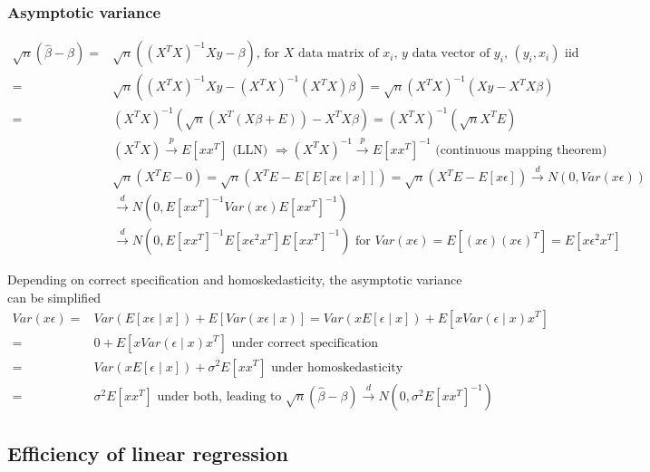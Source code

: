 \documentclass{article}
\begin{document}
\subsubsection{Asymptotic variance}
\begin{align*}
  \sqrt{n}(\hat{\beta} - \beta) =& \sqrt{n}((X^TX)^{-1}Xy - \beta) \textrm{, for $X$ data matrix of $x_i$, $y$ data vector of $y_i$, $(y_i, x_i)$ iid}\\
  =& \sqrt{n}((X^TX)^{-1}Xy - (X^TX)^{-1}(X^TX)\beta) = \sqrt{n}(X^TX)^{-1}(Xy - X^TX\beta) \\
  =& (X^TX)^{-1}\left(\sqrt{n}(X^T(X\beta + E)) - X^TX\beta\right) = (X^TX)^{-1}\left(\sqrt{n}X^TE\right) \\
  &(X^TX) \overset{p}{\longrightarrow} E[xx^T] \textrm{ (LLN) } \Longrightarrow (X^TX)^{-1} \overset{p}{\longrightarrow} E[xx^T]^{-1} \textrm{ (continuous mapping theorem)}\\
  &\sqrt{n}(X^TE - 0) = \sqrt{n}(X^TE - E[E[x\epsilon\mid x]]) = \sqrt{n}(X^TE - E[x\epsilon]) \overset{d}{\longrightarrow} N(0, Var(x\epsilon))\\
  &\overset{d}{\longrightarrow} N(0, E[xx^T]^{-1}Var(x\epsilon)E[xx^T]^{-1})\\
  &\overset{d}{\longrightarrow} N(0, E[xx^T]^{-1}E[x\epsilon^2x^T]E[xx^T]^{-1}) \textrm{ for } Var(x\epsilon) = E[(x\epsilon)(x\epsilon)^T] = E[x\epsilon^2x^T]
\end{align*}

Depending on correct specification and homoskedasticity, the asymptotic variance can be simplified
\begin{align*}
  Var(x\epsilon) =& Var(E[x\epsilon \mid x]) + E[Var(x\epsilon \mid x)] = Var(xE[\epsilon \mid x]) + E[xVar(\epsilon\mid x)x^T]\\
  =& 0 + E[xVar(\epsilon\mid x)x^T] \textrm{ under correct specification}\\
  =& Var(xE[\epsilon \mid x]) + \sigma^2E[xx^T] \textrm{ under homoskedasticity}\\
  =& \sigma^2E[xx^T] \textrm{ under both, leading to } \sqrt{n}(\hat{\beta} - \beta) \overset{d}{\longrightarrow} N(0, \sigma^2E[xx^T]^{-1})
\end{align*}

\subsection{Efficiency of linear regression}
\end{document}
